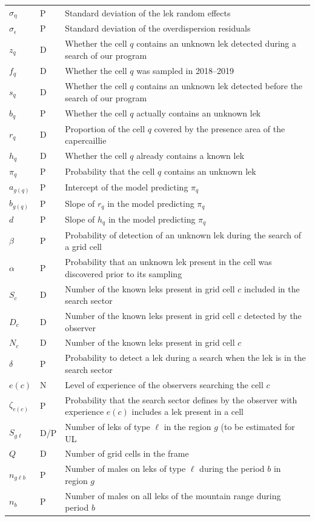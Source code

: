 \documentclass[a4paper]{article}
\newenvironment{Default Paragraph Font}{}{}
\begin{document}
\begin{tabular}{llp{12cm}}
  $\sigma_{\eta}$ & P & Standard deviation of the lek random effects \\ 
  $\sigma_{\epsilon}$ & P & Standard deviation of the overdispersion residuals \\ 
  $z_q$ & D & Whether the cell $q$ contains an unknown lek detected during a search of our program \\ 
  $f_q$ & D & Whether the cell $q$ was sampled in 2018--2019 \\ 
  $s_q$ & D & Whether the cell $q$ contains an unknown lek detected before the search of our program \\ 
  $b_q$ & P & Whether the cell $q$ actually contains an unknown lek \\ 
  $r_q$ & D & Proportion of the cell $q$ covered by the presence area of the capercaillie \\ 
  $h_q$ & D & Whether the cell $q$ already contains a known lek \\ 
  $\pi_q$ & P & Probability that the cell $q$ contains an unknown lek \\ 
  $a_{g(q)}$ & P & Intercept of the model predicting $\pi_q$ \\ 
  $b_{g(q)}$ & P & Slope of $r_q$ in the model predicting $\pi_q$ \\ 
  $d$ & P & Slope of $h_q$ in the model predicting $\pi_q$ \\ 
  $\beta$ & P & Probability of detection of an unknown lek during the search of a grid cell \\ 
  $\alpha$ & P & Probability that an unknown lek present in the cell was discovered prior to its sampling \\ 
  $S_c$ & D & Number of the known leks present in grid cell $c$ included in the search sector \\ 
  $D_c$ & D & Number of the known leks present in grid cell $c$ detected by the observer \\ 
  $N_c$ & D & Number of the known leks present in grid cell $c$ \\ 
  $\delta$ & P & Probability to detect a lek during a search when the lek is in the search sector \\ 
  $e(c)$ & N & Level of experience of the observers searching the cell $c$ \\ 
  $\zeta_{e(c)}$ & P & Probability that the search sector defines by the observer with experience $e(c)$ includes a lek present in a cell \\ 
  $S_{g\ell}$ & D/P & Number of leks of type $\ell$ in the region $g$ (to be estimated for UL \\ 
  $Q$ & D & Number of grid cells in the frame \\ 
  $n_{g\ell b}$ & P & Number of males on leks of type $\ell$ during the period $b$ in region $g$ \\ 
  $n_b$ & P & Number of males on all leks of the mountain range during period $b$ \\ 
   \hline
\end{tabular}
\end{document}
